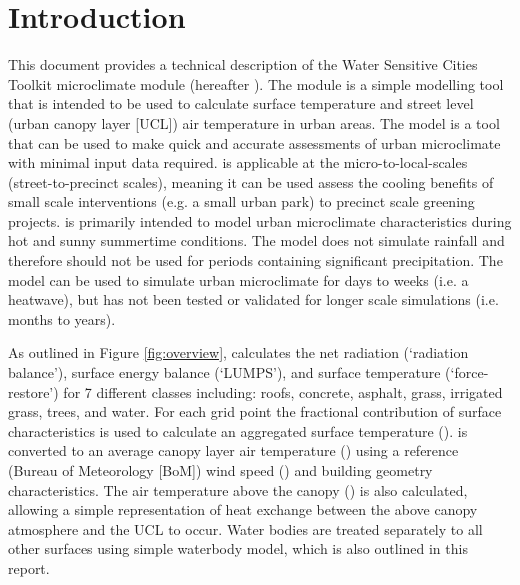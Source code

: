\documentclass[final,3p,times,authoryear]{elsarticle}
\begin{document}







\section{Introduction}\label{sec:introduction}


This document provides a technical description of the Water Sensitive Cities Toolkit microclimate module (hereafter ). The module is a simple modelling tool that is intended to be used to calculate surface temperature and street level (urban canopy layer [UCL]) air temperature in urban areas. The model is a tool that can be used to make quick and accurate assessments of urban microclimate with minimal input data required.  is applicable at the micro-to-local-scales (street-to-precinct scales), meaning it can be used assess the cooling benefits of small scale interventions (e.g. a small urban park) to precinct scale greening projects.  is primarily intended to model urban microclimate characteristics during hot and sunny summertime conditions. The model does not simulate rainfall and therefore should not be used for periods containing significant precipitation. The model can be used to simulate urban microclimate for days to weeks (i.e. a heatwave), but has not been tested or validated for longer scale simulations (i.e. months to years). 


As outlined in Figure \ref{fig:overview},  calculates the net radiation (`radiation balance'), surface energy balance (`LUMPS'), and surface temperature (`force-restore') for 7 different classes including: roofs, concrete, asphalt, grass, irrigated grass, trees, and water.  For each grid point the fractional contribution of surface characteristics is used to calculate an aggregated surface temperature ().  is converted to an average canopy layer air temperature () using a reference (Bureau of Meteorology [BoM]) wind speed () and building geometry characteristics. The air temperature above the canopy () is also calculated, allowing a simple representation of heat exchange between the above canopy atmosphere and the UCL to occur. Water bodies are treated separately to all other surfaces using simple waterbody model, which is also outlined in this report. 
\end{document}
